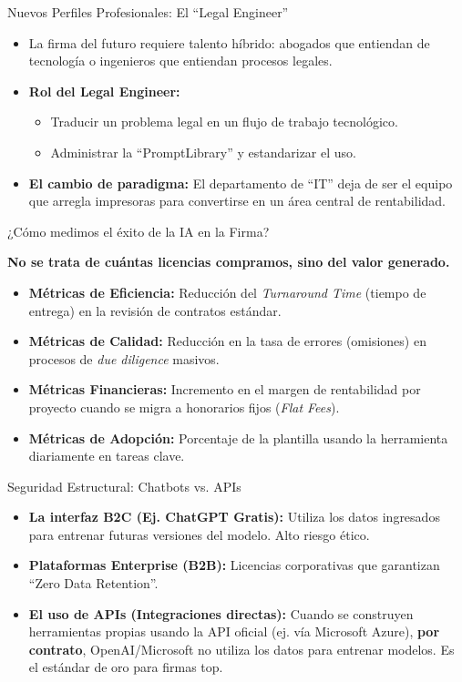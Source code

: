 \documentclass[aspectratio=169]{beamer}
\begin{document}
\begin{frame}{Nuevos Perfiles Profesionales: El ``Legal Engineer''}


\begin{itemize}
  \item La firma del futuro requiere talento híbrido: abogados que entiendan de tecnología o ingenieros que entiendan procesos legales.
  \item \textbf{Rol del Legal Engineer:}
  \begin{itemize}
    \item Traducir un problema legal en un flujo de trabajo tecnológico.
    \item Administrar la ``PromptLibrary'' y estandarizar el uso.
  \end{itemize}
  \item \textbf{El cambio de paradigma:} El departamento de ``IT'' deja de ser el equipo que arregla impresoras para convertirse en un área central de rentabilidad.
\end{itemize}
\end{frame}

\begin{frame}{¿Cómo medimos el éxito de la IA en la Firma?}


\textbf{No se trata de cuántas licencias compramos, sino del valor generado.}

\begin{itemize}
  \item \textbf{Métricas de Eficiencia:} Reducción del \textit{Turnaround Time} (tiempo de entrega) en la revisión de contratos estándar.
  \item \textbf{Métricas de Calidad:} Reducción en la tasa de errores (omisiones) en procesos de \textit{due diligence} masivos.
  \item \textbf{Métricas Financieras:} Incremento en el margen de rentabilidad por proyecto cuando se migra a honorarios fijos (\textit{Flat Fees}).
  \item \textbf{Métricas de Adopción:} Porcentaje de la plantilla usando la herramienta diariamente en tareas clave.
\end{itemize}
\end{frame}

\begin{frame}{Seguridad Estructural: Chatbots vs. APIs}


\begin{itemize}
  \item \textbf{La interfaz B2C (Ej. ChatGPT Gratis):} Utiliza los datos ingresados para entrenar futuras versiones del modelo. Alto riesgo ético.
  \item \textbf{Plataformas Enterprise (B2B):} Licencias corporativas que garantizan ``Zero Data Retention''.
  \item \textbf{El uso de APIs (Integraciones directas):} Cuando se construyen herramientas propias usando la API oficial (ej. vía Microsoft Azure), \textbf{por contrato}, OpenAI/Microsoft no utiliza los datos para entrenar modelos. Es el estándar de oro para firmas top.
\end{itemize}
\end{frame}
\end{document}

